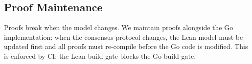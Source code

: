 \subsection{Proof Maintenance}

Proofs break when the model changes. We maintain proofs alongside the Go implementation:
when the consensus protocol changes, the Lean model must be updated first and all proofs
must re-compile before the Go code is modified. This is enforced by CI: the Lean build
gate blocks the Go build gate.

